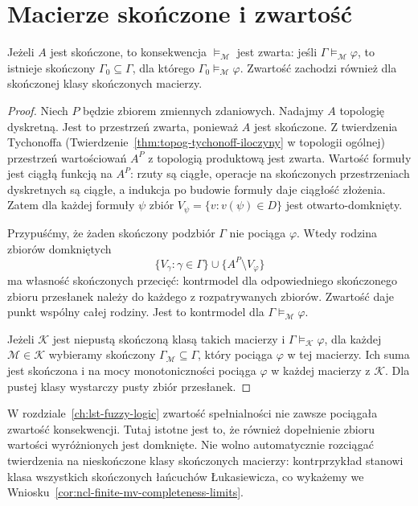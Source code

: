 \section{Macierze skończone i zwartość}
\begin{twierdzenie}
\label{thm:ncl-finite-matrix-compactness}
Jeżeli $A$ jest skończone, to konsekwencja
$\models_{\mathcal M}$ jest zwarta: jeśli
$\Gamma\models_{\mathcal M}\varphi$, to
istnieje skończony $\Gamma_0\subseteq\Gamma$,
dla którego $\Gamma_0\models_{\mathcal M}\varphi$.
Zwartość zachodzi również dla skończonej klasy
skończonych macierzy.
\end{twierdzenie}
\begin{proof}
Niech $P$ będzie zbiorem zmiennych zdaniowych.
Nadajmy $A$ topologię dyskretną. Jest to przestrzeń
zwarta, ponieważ $A$ jest skończone.
Z twierdzenia Tychonoffa
(Twierdzenie~\ref{thm:topog-tychonoff-iloczyny}
w topologii ogólnej) przestrzeń wartościowań
$A^P$ z topologią produktową jest zwarta.
Wartość formuły jest ciągłą funkcją na $A^P$:
rzuty są ciągłe, operacje na skończonych przestrzeniach
dyskretnych są ciągłe, a indukcja po budowie formuły
daje ciągłość złożenia.
Zatem dla każdej formuły $\psi$ zbiór
$V_\psi=\{v:v(\psi)\in D\}$ jest otwarto-domknięty.

Przypuśćmy, że żaden skończony podzbiór $\Gamma$
nie pociąga $\varphi$. Wtedy rodzina zbiorów domkniętych
\[
 \{V_\gamma:\gamma\in\Gamma\}
 \cup\{A^P\setminus V_\varphi\}
\]
ma własność skończonych przecięć: kontrmodel
dla odpowiedniego skończonego zbioru przesłanek
należy do każdego z rozpatrywanych zbiorów.
Zwartość daje punkt wspólny całej rodziny.
Jest to kontrmodel dla $\Gamma\models_{\mathcal M}\varphi$.

Jeżeli $\mathcal K$ jest niepustą skończoną klasą
takich macierzy i $\Gamma\models_{\mathcal K}\varphi$,
dla każdej $\mathcal M\in\mathcal K$ wybieramy
skończony $\Gamma_{\mathcal M}\subseteq\Gamma$,
który pociąga $\varphi$ w tej macierzy.
Ich suma jest skończona i na mocy monotoniczności
pociąga $\varphi$ w każdej macierzy z $\mathcal K$.
Dla pustej klasy wystarczy pusty zbiór przesłanek.
\end{proof}
W rozdziale~\ref{ch:lst-fuzzy-logic} zwartość
spełnialności nie zawsze pociągała zwartość konsekwencji.
Tutaj istotne jest to, że również dopełnienie zbioru
wartości wyróżnionych jest domknięte.
Nie wolno automatycznie rozciągać twierdzenia
na nieskończone klasy skończonych macierzy:
kontrprzykład stanowi klasa wszystkich skończonych
łańcuchów Łukasiewicza, co wykażemy we
Wniosku~\ref{cor:ncl-finite-mv-completeness-limits}.

